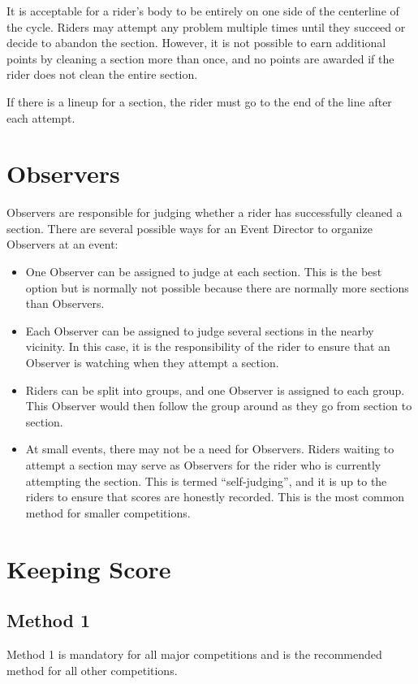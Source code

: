 It is acceptable for a rider's body to be entirely on one side of the centerline of the cycle.
Riders may attempt any problem multiple times until they succeed or decide to abandon the section.
However, it is not possible to earn additional points by cleaning a section more than once, and no points are awarded if the rider does not clean the entire section.

If there is a lineup for a section, the rider must go to the end of the line after each attempt.

\section{Observers}
Observers are responsible for judging whether a rider has successfully cleaned a section. 
There are several possible ways for an Event Director to organize Observers at an event:
\begin{itemize}
\item One Observer can be assigned to judge at each section. 
This is the best option but is normally not possible because there are normally more sections than Observers.
\item Each Observer can be assigned to judge several sections in the nearby vicinity. 
In this case, it is the responsibility of the rider to ensure that an Observer is watching when they attempt a section.
\item Riders can be split into groups, and one Observer is assigned to each group. 
This Observer would then follow the group around as they go from section to section.
\item At small events, there may not be a need for Observers. 
Riders waiting to attempt a section may serve as Observers for the rider who is currently attempting the section. 
This is termed ``self-judging'', and it is up to the riders to ensure that scores are honestly recorded. 
This is the most common method for smaller competitions.
\end{itemize}

\section{Keeping Score}

\subsection{Method 1}
Method 1 is mandatory for all major competitions and is the recommended method for all other competitions.

